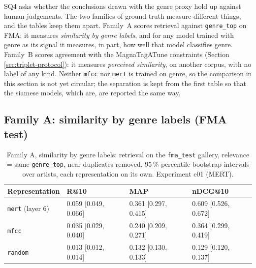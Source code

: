 SQ4 asks whether the conclusions drawn with the genre proxy hold up against
human judgements. The two families of ground truth measure different things,
and the tables keep them apart. Family~A scores retrieval against
\texttt{genre\_top} on FMA: it measures \emph{similarity by genre labels}, and
for any model trained with genre as its signal it measures, in part, how well
that model classifies genre. Family~B scores agreement with the MagnaTagATune
constraints (Section \ref{sec:triplet-protocol}): it measures \emph{perceived
similarity}, on another corpus, with no label of any kind. Neither \texttt{mfcc}
nor \texttt{mert} is trained on genre, so the comparison in this section is not
yet circular; the separation is kept from the first table so that the siamese
models, which are, are reported the same way.

\subsection{Family A: similarity by genre labels (FMA test)}
\label{sec:results-proxy-genre}

\begin{table}[t]
  \centering
  \caption[Family A: similarity by genre labels on FMA test]{Family A,
    similarity by genre labels: retrieval on the
    \texttt{fma\_test} gallery, relevance = same \texttt{genre\_top},
    near-duplicates removed. 95\,\% percentile bootstrap intervals over
    artists, each representation on its own. Experiment e01 (MERT).}
  \label{tab:proxy-family-a}
  \begin{tabular}{@{}llll@{}}
    \toprule
    Representation & R@10 & MAP & nDCG@10 \\
    \midrule
    \texttt{mert} (layer 6) & 0.059 [0.049, 0.066] & 0.361 [0.297, 0.415] & 0.609 [0.526, 0.672] \\
    \texttt{mfcc}           & 0.035 [0.029, 0.040] & 0.240 [0.209, 0.271] & 0.364 [0.299, 0.419] \\
    \texttt{random}         & 0.013 [0.012, 0.014] & 0.132 [0.130, 0.133] & 0.129 [0.120, 0.137] \\
    \bottomrule
  \end{tabular}
\end{table}

